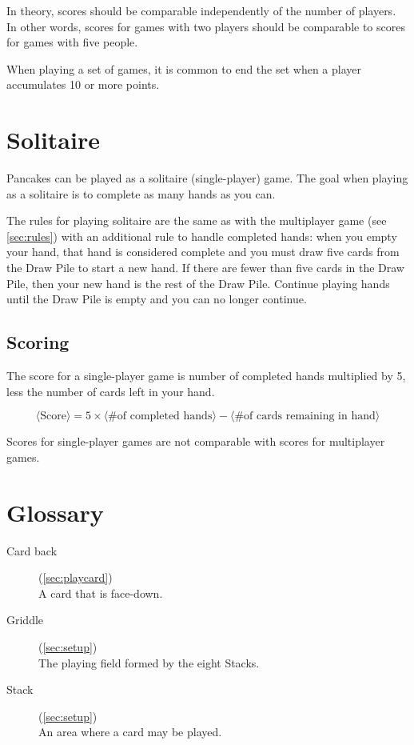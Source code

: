 \documentclass{article}
\begin{document}
In theory, scores should be comparable independently of the number of players. In other words, scores for games with two players should be comparable to scores for games with five people.

When playing a set of games, it is common to end the set when a player accumulates 10 or more points.

\pagebreak
\section{Solitaire}
\label{sec:solitaire}

Pancakes can be played as a solitaire (single-player) game. The goal when playing as a solitaire is to complete as many hands as you can.

The rules for playing solitaire are the same as with the multiplayer game (see \autoref{sec:rules}) with an additional rule to handle completed hands: when you empty your hand, that hand is considered complete and you must draw five cards from the Draw Pile to start a new hand. If there are fewer than five cards in the Draw Pile, then your new hand is the rest of the Draw Pile. Continue playing hands until the Draw Pile is empty and you can no longer continue.

\subsection{Scoring}
\label{sec:solitairescoring}

The score for a single-player game is number of completed hands multiplied by 5, less the number of cards left in your hand.

$$
\langle\textrm{Score}\rangle = 5 \times \langle\textrm{\# of completed hands}\rangle - \langle\textrm{\# of cards remaining in hand}\rangle
$$

Scores for single-player games are not comparable with scores for multiplayer games.

\section{Glossary}
\label{sec:glossary}

\begin{description}
  \item[Card back] (\autoref{sec:playcard})\\
    A card that is face-down.
  \item[Griddle] (\autoref{sec:setup})\\
    The playing field formed by the eight Stacks.
  \item[Stack] (\autoref{sec:setup})\\
    An area where a card may be played.
\end{description}
\end{document}

